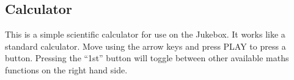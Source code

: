 \subsection{Calculator}
{\centering\itshape
\par}

This is a simple scientific calculator for
use on the Jukebox.  It works like a standard calculator.  Move using
the arrow keys and press PLAY to press a button.  Pressing the ``1st''
button will toggle between other available maths functions on the right
hand side.


